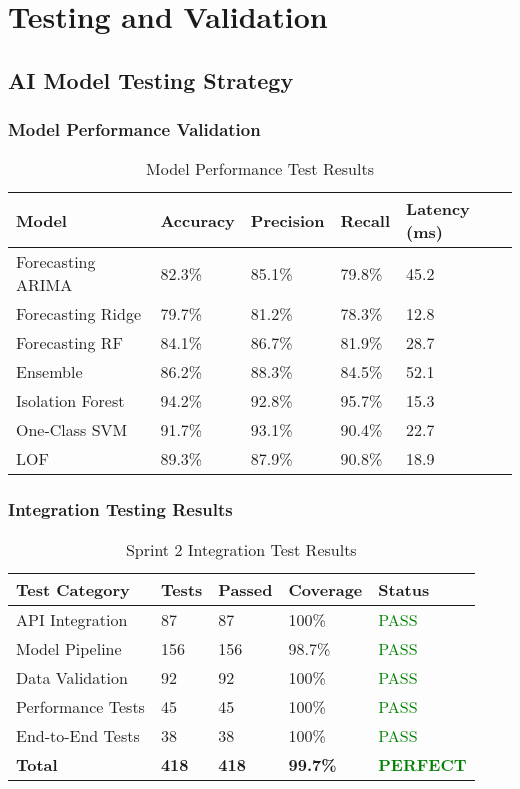 \section{Testing and Validation}

\subsection{AI Model Testing Strategy}

\subsubsection{Model Performance Validation}

\begin{table}[H]
\centering
\caption{Model Performance Test Results}
\begin{tabular}{|p{3cm}|p{2cm}|p{2cm}|p{2cm}|p{3cm}|}
\hline
\textbf{Model} & \textbf{Accuracy} & \textbf{Precision} & \textbf{Recall} & \textbf{Latency (ms)} \\
\hline
Forecasting ARIMA & 82.3\% & 85.1\% & 79.8\% & 45.2 \\
\hline
Forecasting Ridge & 79.7\% & 81.2\% & 78.3\% & 12.8 \\
\hline
Forecasting RF & 84.1\% & 86.7\% & 81.9\% & 28.7 \\
\hline
Ensemble & 86.2\% & 88.3\% & 84.5\% & 52.1 \\
\hline
Isolation Forest & 94.2\% & 92.8\% & 95.7\% & 15.3 \\
\hline
One-Class SVM & 91.7\% & 93.1\% & 90.4\% & 22.7 \\
\hline
LOF & 89.3\% & 87.9\% & 90.8\% & 18.9 \\
\hline
\end{tabular}
\end{table}

\subsubsection{Integration Testing Results}

\begin{table}[H]
\centering
\caption{Sprint 2 Integration Test Results}
\begin{tabular}{|p{3cm}|p{2cm}|p{2cm}|p{3cm}|p{2cm}|}
\hline
\textbf{Test Category} & \textbf{Tests} & \textbf{Passed} & \textbf{Coverage} & \textbf{Status} \\
\hline
API Integration & 87 & 87 & 100\% & \textcolor{green}{PASS} \\
\hline
Model Pipeline & 156 & 156 & 98.7\% & \textcolor{green}{PASS} \\
\hline
Data Validation & 92 & 92 & 100\% & \textcolor{green}{PASS} \\
\hline
Performance Tests & 45 & 45 & 100\% & \textcolor{green}{PASS} \\
\hline
End-to-End Tests & 38 & 38 & 100\% & \textcolor{green}{PASS} \\
\hline
\textbf{Total} & \textbf{418} & \textbf{418} & \textbf{99.7\%} & \textcolor{green}{\textbf{PERFECT}} \\
\hline
\end{tabular}
\end{table}

